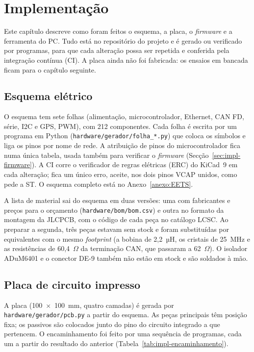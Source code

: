 \chapter{Implementação}
\label{cap:implementacao}

Este capítulo descreve como foram feitos o esquema, a placa, o \textit{firmware}
e a ferramenta do PC. Tudo está no repositório do projeto e é gerado ou
verificado por programas, para que cada alteração possa ser repetida e
conferida pela integração contínua (CI). A placa ainda não foi fabricada:
os ensaios em bancada ficam para o capítulo seguinte.

\section{Esquema elétrico}

O esquema tem sete folhas (alimentação, microcontrolador, Ethernet, CAN FD,
série, I2C e GPS, PWM), com 212 componentes. Cada folha é escrita por um
programa em Python (\texttt{hardware/gerador/folha\_*.py}) que coloca os
símbolos e liga os pinos por nome de rede. A atribuição de pinos do
microcontrolador fica numa única tabela, usada também para verificar o
\textit{firmware} (Secção~\ref{sec:impl-firmware}). A CI corre o verificador
de regras elétricas (ERC) do KiCad~9 em cada alteração; fica um único erro,
aceite, nos dois pinos VCAP unidos, como pede a ST. O esquema completo está
no Anexo~\ref{anexo:EETS}.

A lista de material sai do esquema em duas versões: uma com fabricantes e
preços para o orçamento (\texttt{hardware/bom/bom.csv}) e outra no formato da
montagem da JLCPCB, com o código de cada peça no catálogo LCSC. Ao preparar a
segunda, três peças estavam sem stock e foram substituídas por equivalentes
com o mesmo \textit{footprint} (a bobina de 2,2~µH, os cristais de 25~MHz e as
resistências de 60,4~$\Omega$ da terminação CAN, que passaram a 62~$\Omega$).
O isolador ADuM6401 e o conector DE-9 também não estão em stock e são
soldados à mão.

\section{Placa de circuito impresso}

A placa (100~$\times$~100~mm, quatro camadas) é gerada por
\texttt{hardware/gerador/pcb.py} a partir do esquema. As peças principais
têm posição fixa; os passivos são colocados junto do pino do circuito
integrado a que pertencem. O encaminhamento foi feito por uma sequência de
programas, cada um a partir do resultado do anterior
(Tabela~\ref{tab:impl-encaminhamento}).

